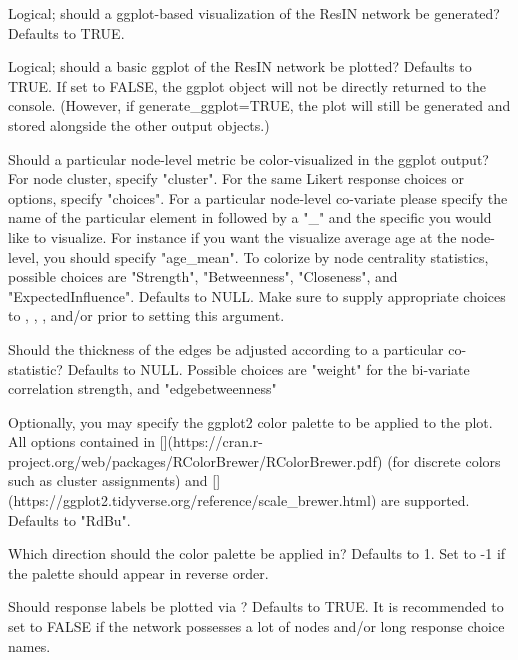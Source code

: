 \documentclass[a4paper]{book}
\begin{document}
\begin{Arguments}
\begin{ldescription}
\item[\code{generate\_ggplot}] Logical; should a ggplot-based visualization of the ResIN network be generated? Defaults to TRUE.

\item[\code{plot\_ggplot}] Logical; should a basic ggplot of the ResIN network be plotted? Defaults to TRUE. If set to FALSE, the ggplot object will not be directly returned to the console. (However, if generate\_ggplot=TRUE, the plot will still be generated and stored alongside the other output objects.)

\item[\code{plot\_whichstat}] Should a particular node-level metric be color-visualized in the ggplot output? For node cluster, specify "cluster". For the same Likert response choices or options, specify "choices". For a particular node-level co-variate please specify the name of the particular element in  followed by a "\_" and the specific  you would like to visualize. For instance if you want the visualize average age at the node-level, you should specify "age\_mean". To colorize by node centrality statistics, possible choices are "Strength", "Betweenness", "Closeness", and "ExpectedInfluence". Defaults to NULL. Make sure to supply appropriate choices to , , , and/or  prior to setting this argument.

\item[\code{plot\_edgestat}] Should the thickness of the edges be adjusted according to a particular co-statistic? Defaults to NULL. Possible choices are "weight" for the bi-variate correlation strength, and "edgebetweenness"

\item[\code{color\_palette}] Optionally, you may specify the ggplot2 color palette to be applied to the plot. All options contained in [](https://cran.r-project.org/web/packages/RColorBrewer/RColorBrewer.pdf) (for discrete colors such as cluster assignments) and [](https://ggplot2.tidyverse.org/reference/scale\_brewer.html) are supported. Defaults to "RdBu".

\item[\code{direction}] Which direction should the color palette be applied in? Defaults to 1. Set to -1 if the palette should appear in reverse order.

\item[\code{plot\_responselabels}] Should response labels be plotted via ? Defaults to TRUE. It is recommended to set to FALSE if the network possesses a lot of nodes and/or long response choice names.


\end{ldescription}
\end{Arguments}
\end{document}
